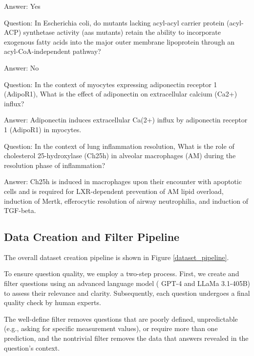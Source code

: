 Answer: Yes

Question: In Escherichia coli, do mutants lacking acyl-acyl carrier protein (acyl-ACP) synthetase activity (aas mutants) retain the ability to incorporate exogenous fatty acids into the major outer membrane lipoprotein through an acyl-CoA-independent pathway?

Answer: No

Question: In the context of myocytes expressing adiponectin receptor 1 (AdipoR1), What is the effect of adiponectin on extracellular calcium (Ca2+) influx?

Answer: Adiponectin induces extracellular Ca(2+) influx by adiponectin receptor 1 (AdipoR1) in myocytes.

Question: In the context of lung inflammation resolution, What is the role of cholesterol 25-hydroxylase (Ch25h) in alveolar macrophages (AM) during the resolution phase of inflammation?

Answer: Ch25h is induced in macrophages upon their encounter with apoptotic cells and is required for LXR-dependent prevention of AM lipid overload, induction of Mertk, efferocytic resolution of airway neutrophilia, and induction of TGF-beta.

\subsection{Data Creation and Filter Pipeline} \label{appendix: data creation}

\begin{figure*}[!h]
    \centering    
    \renewcommand{\thesubfigure}{} %
    \caption{Dataset \benchname creation pipeline.}
    \label{dataset_pipeline}
\end{figure*}

The overall dataset creation pipeline is shown in Figure \ref{dataset_pipeline}. 

To ensure question quality, we employ a two-step process. First, we create and filter questions using an advanced language model ( GPT-4 and
LLaMa 3.1-405B) to assess their relevance and clarity. Subsequently, each question undergoes a final quality check by human experts.

The well-define filter removes questions that are poorly defined, unpredictable (e.g., asking for specific measurement values), or require more than one prediction, and the nontrivial filter removes the data that answers revealed in the question's context. 

